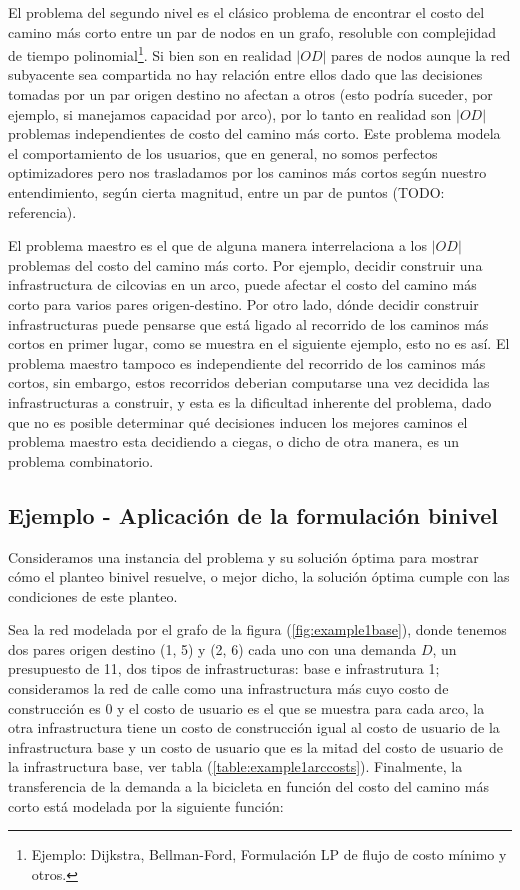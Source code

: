 \documentclass{article}
\begin{document}
  El problema del segundo nivel es el clásico problema de encontrar el costo del camino más corto entre un par de nodos en un grafo, resoluble con complejidad de tiempo polinomial\footnote{Ejemplo: Dijkstra, Bellman-Ford, Formulación LP de flujo de costo mínimo y otros.}. Si bien son en realidad $|OD|$ pares de nodos aunque la red subyacente sea compartida no hay relación entre ellos dado que las decisiones tomadas por un par origen destino no afectan a otros (esto podría suceder, por ejemplo, si manejamos capacidad por arco), por lo tanto en realidad son $|OD|$ problemas independientes de costo del camino más corto. Este problema modela el comportamiento de los usuarios, que en general, no somos perfectos optimizadores pero nos trasladamos por los caminos más cortos según nuestro entendimiento, según cierta magnitud, entre un par de puntos (TODO: referencia).

  El problema maestro es el que de alguna manera interrelaciona a los $|OD|$ problemas del costo del camino más corto. Por ejemplo, decidir construir una infrastructura de cilcovias en un arco, puede afectar el costo del camino más corto para varios pares origen-destino. Por otro lado, dónde decidir construir infrastructuras puede pensarse que está ligado al recorrido de los caminos más cortos en primer lugar, como se muestra en el siguiente ejemplo, esto no es así. El problema maestro tampoco es independiente del recorrido de los caminos más cortos, sin embargo, estos recorridos deberian computarse una vez decidida las infrastructuras a construir, y esta es la dificultad inherente del problema, dado que no es posible determinar qué decisiones inducen los mejores caminos el problema maestro esta decidiendo a ciegas, o dicho de otra manera, es un problema combinatorio.

  \subsection{Ejemplo - Aplicación de la formulación binivel}

  Consideramos una instancia del problema y su solución óptima para mostrar cómo el planteo binivel resuelve, o mejor dicho, la solución óptima cumple con las condiciones de este planteo.

  Sea la red modelada por el grafo de la figura (\ref{fig:example1base}), donde tenemos dos pares origen destino (1, 5) y (2, 6) cada uno con una demanda $D$, un presupuesto de 11, dos tipos de infrastructuras: base e infrastrutura 1; consideramos la red de calle como una infrastructura más cuyo costo de construcción es 0 y el costo de usuario es el que se muestra para cada arco, la otra infrastructura tiene un costo de construcción igual al costo de usuario de la infrastructura base y un costo de usuario que es la mitad del costo de usuario de la infrastructura base, ver tabla (\ref{table:example1arccosts}). Finalmente, la transferencia de la demanda a la bicicleta en función del costo del camino más corto está modelada por la siguiente función:
\end{document}

